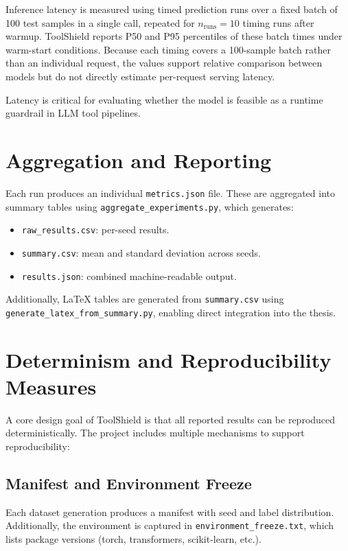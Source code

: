 Inference latency is measured using timed prediction runs over a fixed batch of 100 test samples in a single call, repeated for $n_{\text{runs}}{=}10$ timing runs after warmup. ToolShield reports P50 and P95 percentiles of these batch times under warm-start conditions. Because each timing covers a 100-sample batch rather than an individual request, the values support relative comparison between models but do not directly estimate per-request serving latency.

Latency is critical for evaluating whether the model is feasible as a runtime guardrail in LLM tool pipelines.

\section{Aggregation and Reporting}
\label{subsec:aggregation_reporting}

Each run produces an individual \texttt{metrics.json} file. These are aggregated into summary tables using \texttt{aggregate\_experiments.py}, which generates:

\begin{itemize}
    \item \texttt{raw\_results.csv}: per-seed results.
    \item \texttt{summary.csv}: mean and standard deviation across seeds.
    \item \texttt{results.json}: combined machine-readable output.
\end{itemize}

Additionally, LaTeX tables are generated from \texttt{summary.csv} using \texttt{generate\_latex\_from\_summary.py}, enabling direct integration into the thesis.

\section{Determinism and Reproducibility Measures}
\label{subsec:reproducibility}

A core design goal of ToolShield is that all reported results can be reproduced deterministically. The project includes multiple mechanisms to support reproducibility:

\subsection{Manifest and Environment Freeze}

Each dataset generation produces a manifest with seed and label distribution. Additionally, the environment is captured in \texttt{environment\_freeze.txt}, which lists package versions (torch, transformers, scikit-learn, etc.).

